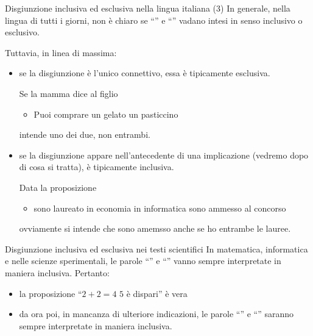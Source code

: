 \documentclass[10pt,dvipsnames]{beamer}
\begin{document}
\begin{frame}{Disgiunzione inclusiva ed esclusiva nella lingua italiana (3)}
    In generale, nella lingua di tutti i giorni, non è chiaro se ``''  e ``'' vadano intesi in senso inclusivo o esclusivo.

    \medskip
    Tuttavia, in linea di massima:
    \begin{itemize}
        \item se la disgiunzione è l'unico connettivo, essa è tipicamente esclusiva.

        \medskip
        Se la mamma dice al figlio
        \begin{itemize}
            \item Puoi comprare un gelato  un pasticcino
        \end{itemize}
        intende uno dei due, non entrambi.

        \pause
        \item se la disgiunzione appare nell'antecedente di una implicazione (vedremo dopo di cosa si tratta), è tipicamente inclusiva.

            \medskip
        Data la proposizione
        \begin{itemize}
            \item {} sono laureato in economia  in informatica sono ammesso al concorso
        \end{itemize}
        ovviamente si intende che sono amemsso anche se ho entrambe le lauree.
    \end{itemize}
\end{frame}

\begin{frame}{Disgiunzione inclusiva ed esclusiva nei testi scientifici}
    In matematica, informatica e nelle scienze sperimentali, le parole ``'' e ``'' vanno sempre interpretate in maniera inclusiva. Pertanto:
    \begin{itemize}
        \item la proposizione ``$2 + 2 = 4$  $5$ è dispari'' è vera
        \item da ora poi, in mancanza di ulteriore indicazioni, le parole ``'' e ``'' saranno sempre interpretate in maniera inclusiva.
    \end{itemize}
\end{frame}

\end{document}
